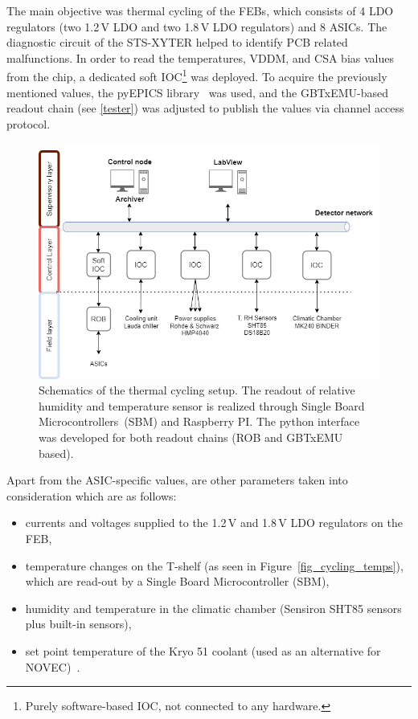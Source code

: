 The main objective was thermal cycling of the \glspl{FEB}, which consists of 4 LDO regulators (two 1.2\,V LDO and two 1.8\,V LDO regulators) and 8 \glspl{ASIC}. The diagnostic circuit of the STS-XYTER helped to identify \gls{PCB} related malfunctions. In order to read the temperatures, VDDM, and  \gls{CSA} bias values from the chip, a dedicated soft IOC\footnote{Purely software-based \gls{IOC}, not connected to any hardware.} was deployed. To acquire the previously mentioned values, the pyEPICS library~\cite{pyEPICS} was used, and the GBTxEMU-based readout chain (see \autoref{tester}) was adjusted to publish the values via channel access protocol. 
\begin{figure}[!h]
\centering
\includegraphics[width=0.85\columnwidth]{Chapter4/images/cycling_scheme.png}
\caption{Schematics of the thermal cycling setup. The readout of relative humidity and temperature sensor is realized through Single Board Microcontrollers~(\gls{SBM}) and Raspberry PI. The python interface was developed for both readout chains (ROB and GBTxEMU based). }
\label{fig_setup}
\end{figure}

\newpage
Apart from the \gls{ASIC}-specific values, are other parameters taken into consideration which are as
follows:
\begin{itemize}
    \item currents and voltages supplied to the 1.2\,V and 1.8\,V \gls{LDO} regulators on the \gls{FEB}, 
    \item temperature changes on the T-shelf (as seen in Figure~\ref{fig_cycling_temps}), which are read-out by a Single Board Microcontroller (\gls{SBM}),
    \item humidity and temperature in the climatic chamber (Sensiron SHT85 sensors plus built-in sensors),
    \item set point temperature of the Kryo 51 coolant (used as an alternative for NOVEC)~\cite{KRYO}.
\end{itemize}

